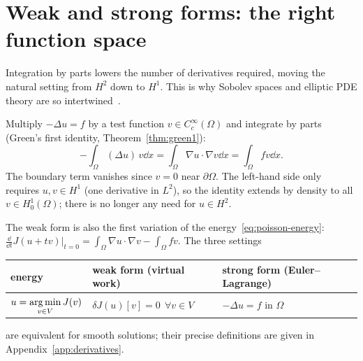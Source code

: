 \section{Weak and strong forms: the right function space}\label{sec:var-weak}
%
Integration by parts lowers the number of derivatives required, moving the
natural setting from $H^2$ down to $H^1$. This is why Sobolev spaces and
elliptic PDE theory are so intertwined~\cite{AdamsFournier2003,Evans2010}.
\begin{center}
\end{center}
Multiply $-\Delta u=f$ by a test function $v\in C_c^\infty(\Omega)$ and
integrate by parts (Green's first identity, Theorem~\ref{thm:green1}):
\[
  -\int_\Omega (\Delta u)\, v\dd x=\int_\Omega \nabla u \cdot \nabla v\dd x
  = \int_\Omega f v\dd x .
\]
The boundary term vanishes since $v=0$ near $\partial\Omega$. The left-hand
side only requires $u,v\in H^1$ (one derivative in $L^2$), so the identity
extends by density to all $v\in H^1_0(\Omega)$; there is no longer any need
for $u\in H^2$.

The weak form is also the first variation of the energy~\eqref{eq:poisson-energy}:
$\displaystyle \frac{\dd}{\dd t}J(u+tv)\big|_{t=0}=\int_\Omega\nabla u\cdot\nabla v-\int_\Omega fv$.
The three settings
\begin{center}
\begin{tabular}{lll}
\toprule
\sffamily energy & \sffamily weak form (virtual work) & \sffamily strong form (Euler--Lagrange)\\
\midrule
$\displaystyle u=\operatorname*{arg\,min}_{v\in V}J(v)$ & $\delta J(u)[v]=0\ \ \forall v\in V$ & $-\Delta u=f$ in $\Omega$\\
\bottomrule
\end{tabular}
\end{center}
are equivalent for smooth solutions; their precise definitions are given in
Appendix~\ref{app:derivatives}.

